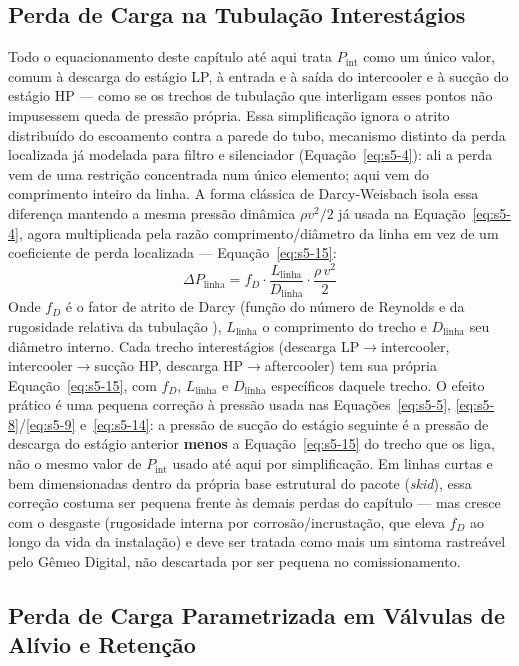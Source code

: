 \documentclass[12pt,a4paper]{article}
\numberwithin{equation}{section}
\numberwithin{table}{section}
\numberwithin{figure}{section}
\begin{document}
{	\subsection{\textbf{Perda de Carga na Tubulação Interestágios}}
	Todo o equacionamento deste capítulo até aqui trata $P_{\text{int}}$ como um único valor, comum à descarga do estágio LP, à entrada e à saída do intercooler e à sucção do estágio HP — como se os trechos de tubulação que interligam esses pontos não impusessem queda de pressão própria. Essa simplificação ignora o atrito distribuído do escoamento contra a parede do tubo, mecanismo distinto da perda localizada já modelada para filtro e silenciador (Equação~\eqref{eq:s5-4}): ali a perda vem de uma restrição concentrada num único elemento; aqui vem do comprimento inteiro da linha. A forma clássica de Darcy-Weisbach isola essa diferença mantendo a mesma pressão dinâmica $\rho v^2/2$ já usada na Equação~\eqref{eq:s5-4}, agora multiplicada pela razão comprimento/diâmetro da linha em vez de um coeficiente de perda localizada \cite{white} — Equação~\eqref{eq:s5-15}:
	\begin{equation}\label{eq:s5-15}
 \Delta P_{\text{linha}} = f_D \cdot \frac{L_{\text{linha}}}{D_{\text{linha}}} \cdot \frac{\rho \, v^2}{2}
\end{equation}
	Onde $f_D$ é o fator de atrito de Darcy (função do número de Reynolds e da rugosidade relativa da tubulação \cite{white}), $L_{\text{linha}}$ o comprimento do trecho e $D_{\text{linha}}$ seu diâmetro interno. Cada trecho interestágios (descarga LP$\to$intercooler, intercooler$\to$sucção HP, descarga HP$\to$aftercooler) tem sua própria Equação~\eqref{eq:s5-15}, com $f_D$, $L_{\text{linha}}$ e $D_{\text{linha}}$ específicos daquele trecho. O efeito prático é uma pequena correção à pressão usada nas Equações~\eqref{eq:s5-5}, \eqref{eq:s5-8}/\eqref{eq:s5-9} e~\eqref{eq:s5-14}: a pressão de sucção do estágio seguinte é a pressão de descarga do estágio anterior \textbf{menos} a Equação~\eqref{eq:s5-15} do trecho que os liga, não o mesmo valor de $P_{\text{int}}$ usado até aqui por simplificação. Em linhas curtas e bem dimensionadas dentro da própria base estrutural do pacote (\textit{skid}), essa correção costuma ser pequena frente às demais perdas do capítulo — mas cresce com o desgaste (rugosidade interna por corrosão/incrustação, que eleva $f_D$ ao longo da vida da instalação) e deve ser tratada como mais um sintoma rastreável pelo Gêmeo Digital, não descartada por ser pequena no comissionamento.

	\subsection{\textbf{Perda de Carga Parametrizada em Válvulas de Alívio e Retenção}}

}
\end{document}
